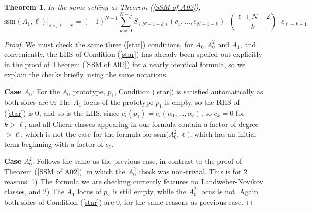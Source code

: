 \documentclass[11pt]{article}
\theoremstyle{plain}
\newtheorem{theorem}[fact]{Theorem}
\theoremstyle{definition}
\theoremstyle{definition}
\begin{document}
\begin{theorem}\label{ssm A1}
In the same setting as Theorem (\ref{SSM of A02}),
\[
\text{ssm}(A_1,\ell)\Big    |_{\text{deg }\ell+N} = (-1)^{N-1}\sum_{k=0}^{N-1}S_{(N-1-k)}(c_1,\dots,c_{N-1-k})\cdot {\ell+N-2\choose k}\cdot c_{\ell+k+1}
\]
\end{theorem}
\begin{proof}
    We must check the same three (\ref{star}) conditions, for $A_0,A_0^2$ and $A_1$, and conveniently, the LHS of Condition (\ref{star}) has already been spelled out explicitly in the proof of Theorem (\ref{SSM of A02}) for a nearly identical formula, so we explain the checks briefly, using the same notations.
    
    \textbf{Case $A_0$}: For the $A_0$ prototype, $p_1$, Condition (\ref{star}) is satisfied automatically as both sides are 0: The $A_1$ locus of the prototype $p_1$ is empty, so the RHS of (\ref{star}) is 0, and so is the LHS, since $c_i(p_1)=e_i(\alpha_1,\dots,\alpha_\ell)$, so $c_k=0$ for $k>\ell$, and all Chern classes appearing in our formula contain a factor of degree $>\ell$, which is not the case for the formula for ssm($A_0^2,\ell)$, which has an initial term beginning with a factor of $c_\ell$. 

    \textbf{Case $A_0^2$}: Follows the same as the previous case, in contrast to the proof of Theorem (\ref{SSM of A02}), in which the $A_0^2$ check was non-trivial. This is for 2 reasons: 1) The formula we are checking currently features no Landweber-Novikov classes, and 2) The $A_1$ locus of $p_2$ is still empty, while the $A_0^2$ locus is not. Again both sides of Condition (\ref{star}) are 0, for the same reasons as previous case. 


\end{proof}
\end{document}
